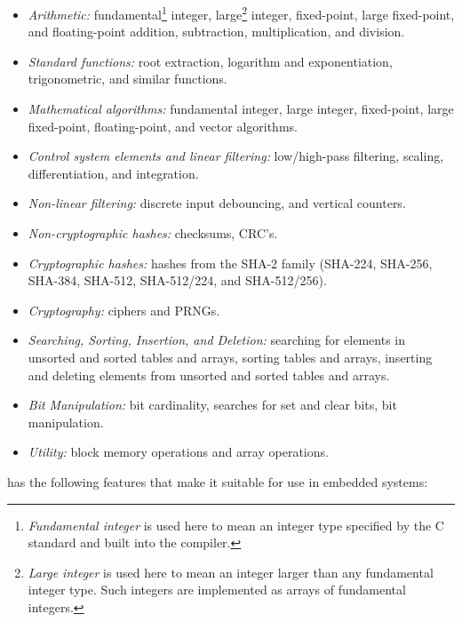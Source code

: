 \begin{itemize}
\item \emph{Arithmetic:}
      fundamental\footnote{\emph{Fundamental integer} is used here
      to mean an integer type
      specified by the C standard and built into the compiler.} integer,
      large\footnote{\emph{Large integer} is used here to mean an integer
      larger than any fundamental integer type.  Such integers are implemented as
      arrays of fundamental integers.} integer, fixed-point, large fixed-point,
      and float\-ing-point addition, subtraction,
      multiplication, and division.
\item \emph{Standard functions:}
      root extraction, logarithm and exponentiation, trigonometric, and similar
      functions.
\item \emph{Mathematical algorithms:}
      fundamental integer, large integer, fixed-point, large fixed-point,
      floating-point, and vector algorithms.
\item \emph{Control system elements and linear filtering:}
      low/high-pass filtering, scaling, differentiation,
      and integration.
\item \emph{Non-linear filtering:}
      discrete input debouncing, and vertical counters.
\item \emph{Non-cryptographic hashes:}
      checksums, CRC's.
\item \emph{Cryptographic hashes:}
      hashes from the SHA-2 family (SHA-224, SHA-256,
      SHA-384, SHA-512, SHA-512/224, and SHA-512/256).
\item \emph{Cryptography:}
      ciphers and PRNGs.
\item \emph{Searching, Sorting, Insertion, and Deletion:}
      searching for elements in unsorted and sorted tables and arrays,
      sorting tables and arrays, inserting and deleting elements from
      unsorted and sorted tables and arrays.
\item \emph{Bit Manipulation:}
      bit cardinality, searches for set and clear bits, bit manipulation.
\item \emph{Utility:}
      block memory
      operations and array operations.
\end{itemize}

\emph{\productbasenameshort{}} has the following features that make it suitable
for use in embedded systems:

